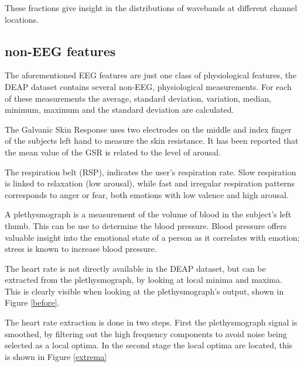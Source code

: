 These fractions give insight in the distributions of wavebands at different channel locations.

\subsection{non-EEG features}
The aforementioned EEG features are just one class of physiological features, the DEAP dataset contains several non-EEG, physiological measurements\citep{DEAP}. For each of these measurements the average, standard deviation, variation, median, minimum, maximum and the standard deviation are calculated.

\npar

The Galvanic Skin Response  uses two electrodes on the middle and index finger of the subjects left hand to measure the skin resistance. It has been reported that the mean value of the GSR is related to the level of arousal\citep{GSR, DEAP}.

\npar

The respiration belt (RSP), indicates the user's respiration rate. Slow respiration is linked to relaxation (low arousal), while fast and irregular respiration patterns corresponds to anger or fear, both emotions with low valence and high arousal\citep{DEAP}.

\npar

A plethysmograph is a measurement of the volume of blood in the subject's left thumb. This can be use to determine the blood pressure. Blood pressure offers valuable insight into the emotional state of a person as it correlates with emotion; stress is known to increase blood pressure\citep{DEAP}.

\npar

The heart rate is not directly available in the DEAP dataset, but can be extracted from the plethysmograph, by looking at local minima and maxima\citep{DEAP}. This is clearly visible when looking at the plethysmograph's output, shown in Figure \ref{before}.


The heart rate extraction is done in two steps. First the plethysmograph signal is smoothed, by filtering out the high frequency components to avoid noise being selected as a local optima. In the second stage the local optima are located, this is shown in Figure \ref{extrema}


